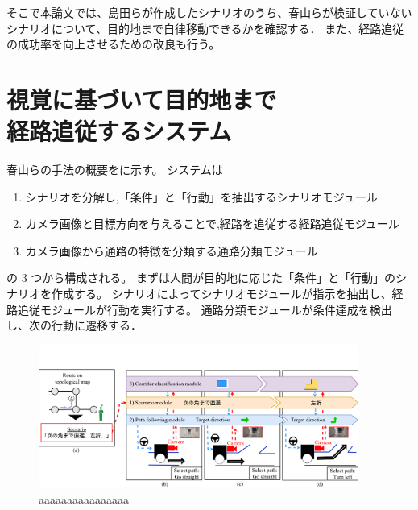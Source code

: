 \documentclass[10pt]{jarticle}
\begin{document}
    そこで本論文では、島田らが作成したシナリオのうち、春山らが検証していないシナリオについて、目的地まで自律移動できるかを確認する．
    また、経路追従の成功率を向上させるための改良も行う。
    \section{視覚に基づいて目的地まで\\経路追従するシステム}
    春山らの手法\cite{haruyama2023}の概要をに示す。
    システムは
    \begin{enumerate}
        \setlength{\parskip}{0cm} %
        \setlength{\itemsep}{0cm} %
        \item シナリオを分解し,「条件」と「行動」を抽出するシナリオモジュール
        \item カメラ画像と目標方向を与えることで,経路を追従する経路追従モジュール
        \item カメラ画像から通路の特徴を分類する通路分類モジュール
    \end{enumerate}
    の 3 つから構成される。
    まずは人間が目的地に応じた「条件」と「行動」のシナリオを作成する。
    シナリオによってシナリオモジュールが指示を抽出し、経路追従モジュールが行動を実行する。
    通路分類モジュールが条件達成を検出し、次の行動に遷移する．
    \begin{figure}[t]
        \centering
        \includegraphics[width=105mm]{./fig/haruyama/system.pdf}
        \caption{aaaaaaaaaaaaaaaa}
        \label{fig:system}
    \end{figure}

\end{document}
